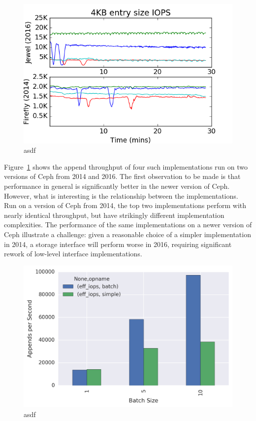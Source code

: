 \begin{figure}[t]
\centering
\includegraphics[width=1.0\linewidth]{jewel_v_firefly_pd.png}
\caption{asdf}
\label{fig:phy-design}
\end{figure}

Figure~\ref{fig:phy-design} shows the append throughput of four such
implementations run on two versions of Ceph from 2014 and 2016. The first
observation to be made is that performance in general is significantly better
in the newer version of Ceph. However, what is interesting is the relationship
between the implementations. Run on a version of Ceph from 2014, the top two
implementations perform with nearly identical throughput, but have strikingly
different implementation complexities. The performance of the same
implementations on a newer version of Ceph illustrate a challenge: given a
reasonable choice of a simpler implementation in 2014, a storage interface
will perform worse in 2016, requiring significant rework of low-level
interface implementations.

\begin{figure}[t]
\centering
\includegraphics[width=1.0\linewidth]{batching.png}
\caption{asdf}
\label{fig:jewel-hdd-128b}
\end{figure}

